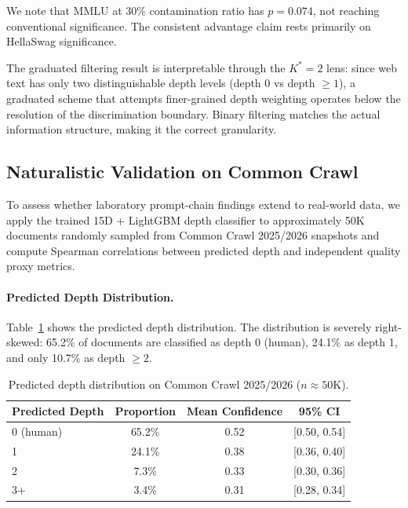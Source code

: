 \documentclass[11pt,a4paper]{article}
\begin{document}
We note that MMLU at 30\% contamination ratio has $p = 0.074$, not reaching conventional significance. The consistent advantage claim rests primarily on HellaSwag significance.

The graduated filtering result is interpretable through the $K^*=2$ lens: since web text has only two distinguishable depth levels (depth 0 vs depth $\geq 1$), a graduated scheme that attempts finer-grained depth weighting operates below the resolution of the discrimination boundary. Binary filtering matches the actual information structure, making it the correct granularity.

\subsection{Naturalistic Validation on Common Crawl}
\label{sec:naturalistic}

To assess whether laboratory prompt-chain findings extend to real-world data, we apply the trained 15D + LightGBM depth classifier to approximately 50K documents randomly sampled from Common Crawl 2025/2026 snapshots and compute Spearman correlations between predicted depth and independent quality proxy metrics.

\paragraph{Predicted Depth Distribution.}
Table~\ref{tab:cc_depth} shows the predicted depth distribution. The distribution is severely right-skewed: 65.2\% of documents are classified as depth 0 (human), 24.1\% as depth 1, and only 10.7\% as depth $\geq 2$.

\begin{table}[h]
\centering
\caption{Predicted depth distribution on Common Crawl 2025/2026 ($n \approx 50$K).}
\label{tab:cc_depth}
\small
\begin{tabular}{lccc}
\toprule
\textbf{Predicted Depth} & \textbf{Proportion} & \textbf{Mean Confidence} & \textbf{95\% CI} \\
\midrule
0 (human) & 65.2\% & 0.52 & [0.50, 0.54] \\
1 & 24.1\% & 0.38 & [0.36, 0.40] \\
2 & 7.3\% & 0.33 & [0.30, 0.36] \\
3+ & 3.4\% & 0.31 & [0.28, 0.34] \\
\bottomrule
\end{tabular}
\end{table}
\end{document}
